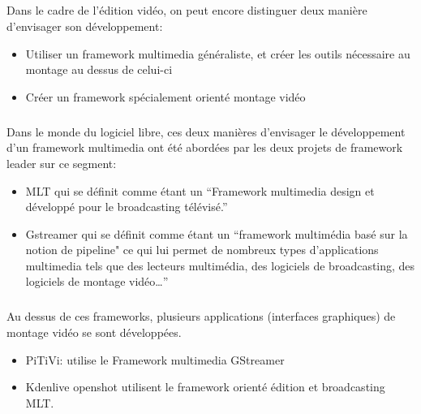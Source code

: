 \subparagraph{}

Dans le cadre de l'édition vidéo, on peut encore distinguer deux
manière d'envisager son développement:

\begin {itemize}

  \item {Utiliser un framework multimedia généraliste, et créer les
  outils nécessaire
         au montage au dessus de celui-ci} %

  \item {Créer un framework spécialement orienté montage vidéo}

\end {itemize}

\subparagraph{}

Dans le monde du logiciel libre, ces deux manières d'envisager le
développement d'un framework multimedia ont été abordées par les
deux projets de framework leader sur ce segment:

\begin {itemize}

  \item {MLT qui se définit comme étant un ``Framework multimedia design
    et développé pour le broadcasting télévisé.''}

  \item {Gstreamer qui se définit comme étant un ``framework multimédia
    basé sur la notion de pipeline" ce qui lui permet de nombreux types
    d'applications multimedia tels que des lecteurs multimédia, des
    logiciels de broadcasting, des logiciels de montage vidéo\ldots''}

\end {itemize}

\subparagraph {}

Au dessus de ces frameworks, plusieurs applications (interfaces
graphiques) de montage vidéo se sont développées.

\begin {itemize}

  \item {PiTiVi: utilise le Framework multimedia GStreamer}

  \item {Kdenlive openshot utilisent le framework
  orienté édition et broadcasting MLT.}

\end {itemize}

